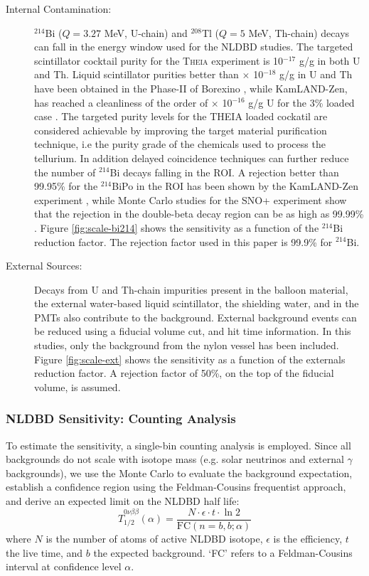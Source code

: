 \begin{description}
\item[Internal Contamination:] $^{214}$Bi ($Q=3.27$ MeV, U-chain) and $^{208}$Tl ($Q=5$ MeV, Th-chain) decays can fall in the energy window used for the NLDBD studies. The targeted scintillator cocktail purity for the \textsc{Theia} experiment is 10$^{-17}$ g/g in both U and Th. Liquid scintillator purities better than $\times$ 10$^{-18}$ g/g in U and Th have been obtained in the Phase-II of Borexino \cite{bxo16}, while KamLAND-Zen, has reached a cleanliness of the order of $\times$ 10$^{-16}$ g/g U for the 3\% loaded case \cite{gando13}. The targeted purity levels for the THEIA loaded cockatil are considered achievable by improving the target material purification technique, i.e the purity grade of the chemicals used to process the tellurium. In addition delayed coincidence techniques can further reduce the number of $^{214}$Bi decays falling in the ROI. A rejection better than 99.95\% for the $^{214}$BiPo in the ROI has been shown by the KamLAND-Zen experiment \cite{KD-Zen}, while Monte Carlo studies for the SNO+ experiment show that the rejection in the double-beta decay region can be as high as 99.99\% \cite{snop16}. Figure \ref{fig:scale-bi214} shows the sensitivity as a function of the $^{214}$Bi reduction factor. The rejection factor used in this paper is 99.9\% for $^{214}$Bi.
\item[External Sources:] Decays from U and Th-chain impurities present in the balloon material, the external water-based liquid scintillator, the
shielding water, and in the PMTs also contribute to the background. External background events can be reduced using a fiducial volume cut, and hit time information. In this studies, only the background from the nylon vessel has been included. Figure \ref{fig:scale-ext} shows the sensitivity as a function of the externals reduction factor. A rejection factor of 50\%, on the top of the fiducial volume, is assumed.
\end{description}

\subsubsection{NLDBD Sensitivity: Counting Analysis}\label{sec::sensitivity}

To estimate the sensitivity, a single-bin counting analysis is employed. Since all backgrounds do not scale with isotope mass (e.g. solar neutrinos
and external $\gamma$ backgrounds), we use the Monte Carlo to evaluate the background expectation, establish a confidence region using the Feldman-Cousins frequentist approach, and derive an expected limit on the NLDBD half life:
\begin{equation}
\label{eq:sens}
\widehat{T}_{1/2}^{0\nu\beta\beta}(\alpha) = 
\frac{N\cdot \epsilon \cdot t \cdot \ln 2}{\mathrm{FC}(n=b, b; \alpha)}
\end{equation}
where $N$ is the number of atoms of active NLDBD isotope, $\epsilon$ is the efficiency, $t$ the live time, and $b$ the expected background.
`FC' refers to a Feldman-Cousins interval at confidence level $\alpha$.

